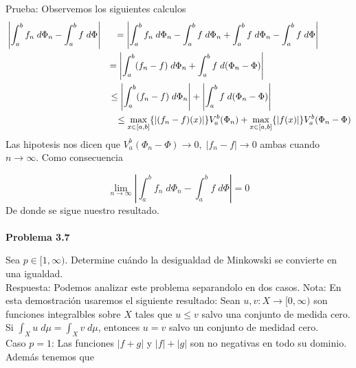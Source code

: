 \documentclass[12pt]{article}
\begin{document}
    Prueba: Observemos los siguientes calculos
    \begin{equation*}
        \begin{aligned}
            &\left| \int_a^bf_n\;d\Phi_n-\int_a^bf\;d\Phi \right| & = \left| \int_a^bf_n\;d\Phi_n-\int_a^bf\;d\Phi_n+\int_a^bf\;d\Phi_n-\int_a^bf\;d\Phi \right| \hspace*{36pt} \\
            & & = \left| \int_a^b(f_n-f)\;d\Phi_n+\int_a^bf\;d(\Phi_n-\Phi) \right| \hspace*{96pt} \\
            & & \leq \left| \int_a^b(f_n-f)\;d\Phi_n\right|+\left|\int_a^bf\;d(\Phi_n-\Phi) \right| \hspace*{88pt} \\
            & & \leq \max_{x\in [a,b]}\{ |(f_n-f)(x)|\} V_a^b(\Phi_n)+\max_{x\in [a,b]}\{ |f(x)|\} V_a^b(\Phi_n-\Phi)
        \end{aligned}
    \end{equation*}
    Las hipotesis nos dicen que $V_a^b(\Phi_n-\Phi)\rightarrow 0,\; |f_n-f|\rightarrow 0$
    ambas cuando $n\rightarrow \infty$. Como consecuencia

    \[\lim_{n\rightarrow \infty} \left| \int_a^bf_n\;d\Phi_n-\int_a^bf\;d\Phi \right| = 0\]
    De donde se sigue nuestro resultado.
    \\ \\
 

    \textbf{Problema 3.7}

    Sea $p\in [1,\infty )$. Determine cu\'ando la desigualdad de Minkowski se convierte 
    en una igualdad.
    \\

    Respuesta: Podemos analizar este problema separandolo en dos casos.
    Nota: En esta demostraci\'on usaremos el siguiente resultado: Sean 
    $u,v:X\rightarrow [0,\infty)$ son funciones integralbles sobre $X$ tales que $u\leq v$
    salvo una conjunto de medida cero. Si $\int_X u\;d\mu = \int_X v\;d\mu$, entonces 
    $u = v$ salvo un conjunto de medidad cero.
    \\

    Caso $p = 1$: Las funciones $|f+g|$ y $|f|+|g|$ son no negativas en todo su dominio. 
    Adem\'as tenemos que    
\end{document}
